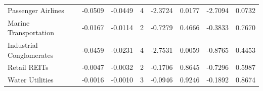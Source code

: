\begin{table}
\begin{tabular}{lrrrrrrr}
Passenger Airlines & -0.0509 & -0.0449 & 4 & -2.3724 & 0.0177 & -2.7094 & 0.0732 \\
Marine Transportation & -0.0167 & -0.0114 & 2 & -0.7279 & 0.4666 & -0.3833 & 0.7670 \\
Industrial Conglomerates & -0.0459 & -0.0231 & 4 & -2.7531 & 0.0059 & -0.8765 & 0.4453 \\
Retail REITs & -0.0047 & -0.0032 & 2 & -0.1706 & 0.8645 & -0.7296 & 0.5987 \\
Water Utilities & -0.0016 & -0.0010 & 3 & -0.0946 & 0.9246 & -0.1892 & 0.8674 \\
\bottomrule
\end{tabular}
\end{table}

